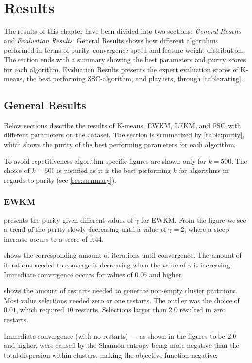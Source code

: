\documentclass[../report.tex]{subfiles}
\begin{document}
\chapter{Results}
The results of this chapter have been divided into two sections: \textit{General Results} and \textit{Evaluation Results}. General Results shows how different algorithms performed in terms of purity, convergence speed and feature weight distribution. The section ends with a summary showing the best parameters and purity scores for each algorithm. Evaluation Results presents the expert evaluation scores of K-means, the best performing SSC-algorithm, and playlists, through \cref{table:rating}.

\section{General Results}
\label{section:general}
Below sections describe the results of K-means, EWKM, LEKM, and FSC with different parameters on the dataset. The section is summarized by \cref{table:purity}, which shows the purity of the best performing parameters for each algorithm.

To avoid repetitiveness algorithm-specific figures are shown only for $k=500$. The choice of $k=500$ is justified as it is the best performing $k$ for algorithms in regards to purity (see \cref{res:summary}).

\subsection{EWKM}
\label{subsection:ewkm}

 presents the purity given different values of $\gamma$ for EWKM. From the figure we see a trend of the purity slowly decreasing until a value of $\gamma = 2$, where a steep increase occurs to a score of $0.44$.

 shows the corresponding amount of iterations until convergence. The amount of iterations needed to converge is decreasing when the value of $\gamma$ is increasing. Immediate convergence occurs for values of $0.05$ and higher.

 shows the amount of restarts needed to generate non-empty cluster partitions. Most value selections needed zero or one restarts. The outlier was the choice of $0.01$, which required $10$ restarts. Selections larger than $2.0$ resulted in zero restarts.

Immediate convergence (with no restarts) --- as shown in the figures to be $2.0$ and higher, were caused by the Shannon entropy being more negative than the total dispersion within clusters, making the objective function negative.
\end{document}

